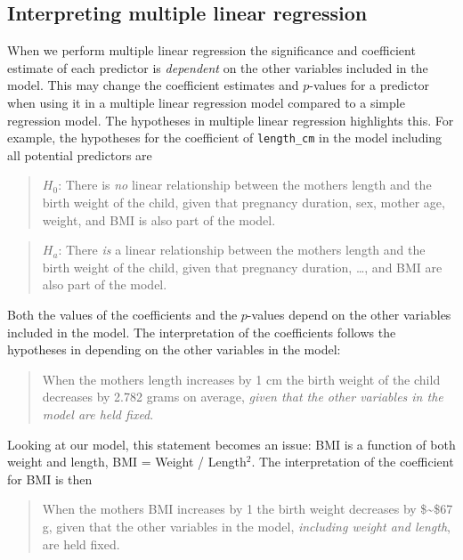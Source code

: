 \documentclass[
  letterpaper,
  DIV=11,
  numbers=noendperiod]{scrreprt}
\begin{document}
\subsection{Interpreting multiple linear
regression}\label{interpreting-multiple-linear-regression}

When we perform multiple linear regression the significance and
coefficient estimate of each predictor is \emph{dependent} on the other
variables included in the model. This may change the coefficient
estimates and \(p\)-values for a predictor when using it in a multiple
linear regression model compared to a simple regression model. The
hypotheses in multiple linear regression highlights this. For example,
the hypotheses for the coefficient of \texttt{length\_cm} in the model
including all potential predictors are

\begin{quote}
\textbf{\(H_0\)}: There is \emph{no} linear relationship between the
mothers length and the birth weight of the child, given that pregnancy
duration, sex, mother age, weight, and BMI is also part of the model.
\end{quote}

\begin{quote}
\textbf{\(H_a\)}: There \emph{is} a linear relationship between the
mothers length and the birth weight of the child, given that pregnancy
duration, \ldots, and BMI are also part of the model.
\end{quote}

Both the values of the coefficients and the \(p\)-values depend on the
other variables included in the model. The interpretation of the
coefficients follows the hypotheses in depending on the other variables
in the model:

\begin{quote}
When the mothers length increases by 1 cm the birth weight of the child
decreases by 2.782 grams on average, \emph{given that the other
variables in the model are held fixed}.
\end{quote}

Looking at our model, this statement becomes an issue: BMI is a function
of both weight and length, BMI = Weight / Length\(^2\). The
interpretation of the coefficient for BMI is then

\begin{quote}
When the mothers BMI increases by 1 the birth weight decreases by
\$\sim\$67 g, given that the other variables in the model,
\emph{including weight and length}, are held fixed.
\end{quote}
\end{document}
